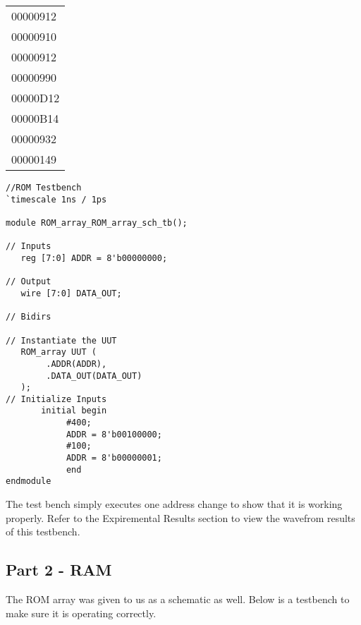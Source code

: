 \documentclass[12pt]{article}
\begin{document}
\begin{flushleft}
\begin{tabular}{|l|}
\hline
00000912 \\
00000910 \\
00000912 \\
00000990 \\
00000D12 \\
00000B14 \\
00000932 \\
00000149 \\
\hline
\end{tabular}
\end{flushleft}

		
		\begin{Verbatim}[frame=single, fontsize= \small]
//ROM Testbench
`timescale 1ns / 1ps

module ROM_array_ROM_array_sch_tb();

// Inputs
   reg [7:0] ADDR = 8'b00000000;

// Output
   wire [7:0] DATA_OUT;

// Bidirs

// Instantiate the UUT
   ROM_array UUT (
		.ADDR(ADDR), 
		.DATA_OUT(DATA_OUT)
   );
// Initialize Inputs
       initial begin
			#400;
			ADDR = 8'b00100000;
			#100;
			ADDR = 8'b00000001;
			end
endmodule
		\end{Verbatim}
		The test bench simply executes one address change to show that it is working properly. Refer to the Expiremental Results section to view the wavefrom results of this testbench.
		\begin{center}
		\end{center}

		\newpage
		\subsection{Part 2 - RAM}
		The ROM array was given to us as a schematic as well. Below is a testbench to make sure it is operating correctly.
\end{document}
